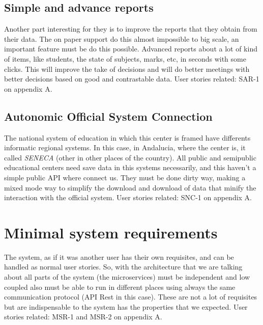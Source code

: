 \subsection{Simple and advance reports}

Another part interesting for they is to improve the reports that they obtain from
their data. The on paper support do this almost impossible to big scale, an
important feature must be do this possible. Advanced reports about a lot of kind
of items, like students, the state of subjects, marks, etc, in seconds with some clicks.
This will improve the take of decisions and will do better meetings with better
decisions based on good and contrastable data.
\intro
User stories related: SAR-1 on appendix A.

\subsection{Autonomic Official System Connection}

The national system of education in which this center is framed have differents
informatic regional systems. In this case, in Andalucia, where the center is, it called
\textit{SENECA} (other in other places of the country). All public and semipublic educational
centers need save data in this systems necessarily, and this haven't a simple public
API where connect us. They must be done dirty way, making a mixed mode way to simplify
the download and download of data that minify the interaction with the official system.
\intro
User stories related: SNC-1 on appendix A.

\section{Minimal system requirements}

The system, as if it was another user has their own requisites,
and can be handled as normal user stories.
So, with the architecture that we are talking about all parts of the system
(the microservices) must be independent and low coupled also must be able to run
in different places using always the same communication protocol (API Rest in this case).
These are not a lot of requisites but are indispensable to the system has the properties
that we expected.
\intro
User stories related: MSR-1 and MSR-2 on appendix A.
